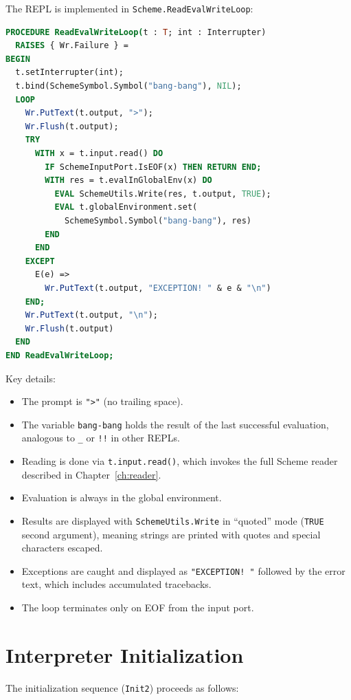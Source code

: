 \documentclass[12pt]{report}
\begin{document}
The REPL is implemented in \texttt{Scheme.ReadEvalWriteLoop}:

\begin{lstlisting}[language=Modula3]
PROCEDURE ReadEvalWriteLoop(t : T; int : Interrupter)
  RAISES { Wr.Failure } =
BEGIN
  t.setInterrupter(int);
  t.bind(SchemeSymbol.Symbol("bang-bang"), NIL);
  LOOP
    Wr.PutText(t.output, ">");
    Wr.Flush(t.output);
    TRY
      WITH x = t.input.read() DO
        IF SchemeInputPort.IsEOF(x) THEN RETURN END;
        WITH res = t.evalInGlobalEnv(x) DO
          EVAL SchemeUtils.Write(res, t.output, TRUE);
          EVAL t.globalEnvironment.set(
            SchemeSymbol.Symbol("bang-bang"), res)
        END
      END
    EXCEPT
      E(e) =>
        Wr.PutText(t.output, "EXCEPTION! " & e & "\n")
    END;
    Wr.PutText(t.output, "\n");
    Wr.Flush(t.output)
  END
END ReadEvalWriteLoop;
\end{lstlisting}

Key details:

\begin{itemize}
\item The prompt is \texttt{">"} (no trailing space).
\item The variable \texttt{bang-bang} holds the result of the last
  successful evaluation, analogous to \texttt{\_} or \texttt{!!}
  in other REPLs.
\item Reading is done via \texttt{t.input.read()}, which invokes
  the full Scheme reader described in Chapter~\ref{ch:reader}.
\item Evaluation is always in the global environment.
\item Results are displayed with \texttt{SchemeUtils.Write} in
  ``quoted'' mode (\texttt{TRUE} second argument), meaning strings
  are printed with quotes and special characters escaped.
\item Exceptions are caught and displayed as
  \texttt{"EXCEPTION!~"} followed by the error text, which includes
  accumulated tracebacks.
\item The loop terminates only on EOF from the input port.
\end{itemize}

\section{Interpreter Initialization}

The initialization sequence (\texttt{Init2}) proceeds as follows:
\end{document}
